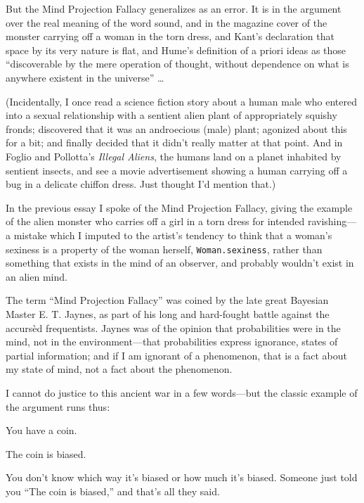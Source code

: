 {
 But the Mind Projection Fallacy generalizes as an error. It is in
the argument over the real meaning of the word sound, and in the
magazine cover of the monster carrying off a woman in the torn dress,
and Kant's declaration that space by its very nature is
flat, and Hume's definition of a priori ideas as those
``discoverable by the mere operation of thought,
without dependence on what is anywhere existent in the
universe'' \ldots}

{
 (Incidentally, I once read a science fiction story about a human
male who entered into a sexual relationship with a sentient alien plant
of appropriately squishy fronds; discovered that it was an androecious
(male) plant; agonized about this for a bit; and finally decided that
it didn't really matter at that point. And in Foglio
and Pollotta's \textit{Illegal Aliens}, the humans land
on a planet inhabited by sentient insects, and see a movie
advertisement showing a human carrying off a bug in a delicate chiffon
dress. Just thought I'd mention that.)}

\myendsectiontext


{
 In the previous essay I spoke of the Mind Projection Fallacy,
giving the example of the alien monster who carries off a girl in a
torn dress for intended ravishing---a mistake which I imputed to the
artist's tendency to think that a
woman's sexiness is a property of the woman herself,
\texttt{Woman.sexiness}, rather than something that exists in the mind of an
observer, and probably wouldn't exist in an alien
mind.}

{
 The term ``Mind Projection
Fallacy'' was coined by the late great Bayesian
Master E. T. Jaynes, as part of his long and hard-fought battle against
the accursèd frequentists. Jaynes was of the opinion that probabilities
were in the mind, not in the environment---that probabilities express
ignorance, states of partial information; and if I am ignorant of a
phenomenon, that is a fact about my state of mind, not a fact about the
phenomenon.}

{
 I cannot do justice to this ancient war in a few words---but the
classic example of the argument runs thus:}

{
 You have a coin.}

{
 The coin is biased.}

{
 You don't know which way it's
biased or how much it's biased. Someone just told you
``The coin is biased,'' and
that's all they said.}

